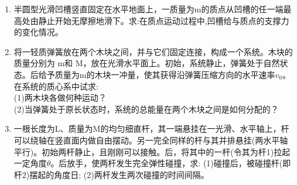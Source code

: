 \begin{enumerate}
\item 半圆型光滑凹槽竖直固定在水平地面上，一质量为m的质点从凹槽的任一端最高处由静止开始无摩擦地滑下。求:在质点运动过程中,凹槽给与质点的支撑力的变化情况。
\item 将一轻质弹簧放在两个木块之间，并与它们固定连接，构成一个系统。木块的质量分别为 m和 M，放在光滑水平面上。初始，系统静止，弹簧处于自然状态。后给予质量为m的木块一冲量，使其获得沿弹簧压缩方向的水平速率$v_0$。在系统的质心系中试求:\\
(1)两木块各做何种运动？\\
(2)当弹簧处于原长状态时，系统的总能量在两个木块之间是如何分配的？
\item 一根长度为L、质量为M的均匀细直杆，其一端悬挂在一光滑、水平轴上，杆可以绕轴在竖直面内做自由摆动。另一完全同样的杆与其并排悬挂(两水平轴平行)。初始两杆静止，且刚刚可以接触。后，将其中的一杆(令其为杆1)拉起一定角度$\theta$。后放手，使两杆发生完全弹性碰撞，求:
(1)碰撞后，被碰撞杆(即杆2)摆起的角度日;
(2)两杆发生两次碰撞的时间间隔。
\end{enumerate}
